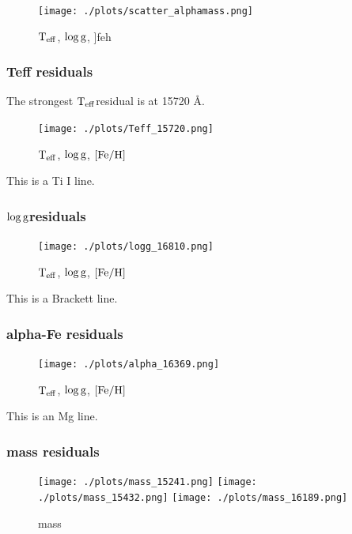 \documentclass[12pt, preprint]{aastex}
\newcommand{\teff}{\mbox{$\rm T_{eff}$}}
\newcommand{\feh}{\mbox{$\rm [Fe/H]$}}
\newcommand{\logg}{\mbox{$\rm \log g$}}
\begin{document}
\begin{figure}[p!]
\centering
    \texttt{[image: ./plots/scatter\_alphamass.png]}
  \caption{\teff, \logg, ]feh}
\label{fig:validation}
\end{figure}

\subsubsection{Teff residuals}

The strongest \teff residual is at 15720 \AA. 

\begin{figure}[p!]
\centering
    \texttt{[image: ./plots/Teff\_15720.png]}
  \caption{\teff, \logg, \feh}
\label{fig:validation}
\end{figure}

This is a Ti I line. \\


\subsubsection{\logg residuals}

\begin{figure}[p!]
\centering
    \texttt{[image: ./plots/logg\_16810.png]}
  \caption{\teff, \logg, \feh}
\label{fig:validation}
\end{figure}

This is a Brackett line. \\

\subsubsection{alpha-Fe residuals}

\begin{figure}[p!]
\centering
    \texttt{[image: ./plots/alpha\_16369.png]}
  \caption{\teff, \logg, \feh}
\label{fig:validation}
\end{figure}

This is an Mg line. \\

\subsubsection{mass residuals}

\begin{figure}[p!]
\centering
    \texttt{[image: ./plots/mass\_15241.png]}
        \texttt{[image: ./plots/mass\_15432.png]}
               \texttt{[image: ./plots/mass\_16189.png]}
  \caption{mass}
\label{fig:validation}
\end{figure}
\end{document}
